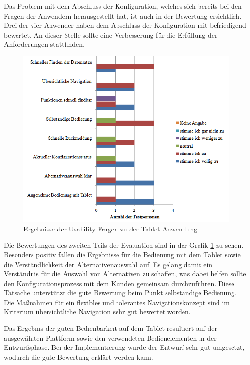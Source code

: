 Das Problem mit dem Abschluss der Konfiguration, welches sich bereits bei den Fragen der Anwendern herausgestellt hat, ist auch in der Bewertung ersichtlich. Drei der vier Anwender haben dem Abschluss der Konfiguration mit befriedigend bewertet. An dieser Stelle sollte eine Verbesserung für die Erfüllung der Anforderungen stattfinden. \par 
\begin{figure}[H]
\centering
\includegraphics{images/bewertung_tabletComplete}
\caption{Ergebnisse der Usability Fragen zu der Tablet Anwendung}
\label{bewertungUx}
\end{figure}
Die Bewertungen des zweiten Teils der Evaluation sind in der Grafik \ref{bewertungUx} zu sehen. Besonders positiv fallen die Ergebnisse für die Bedienung mit dem Tablet sowie die Verständlichkeit der Alternativenauswahl auf. Es gelang damit ein Verständnis für die Auswahl von Alternativen zu schaffen, was dabei helfen sollte den Konfigurationsprozess mit dem Kunden gemeinsam durchzuführen. Diese Tatsache unterstützt die gute Bewertung beim Punkt selbständige Bedienung. Die Maßnahmen für ein flexibles und tolerantes Navigationskonzept sind im Kriterium übersichtliche Navigation sehr gut bewertet worden.

Das Ergebnis der guten Bedienbarkeit auf dem Tablet resultiert auf der ausgewählten Plattform sowie den verwendeten Bedienelementen in der Entwurfsphase. Bei der Implementierung wurde der Entwurf sehr gut umgesetzt, wodurch die gute Bewertung erklärt werden kann. \par 


